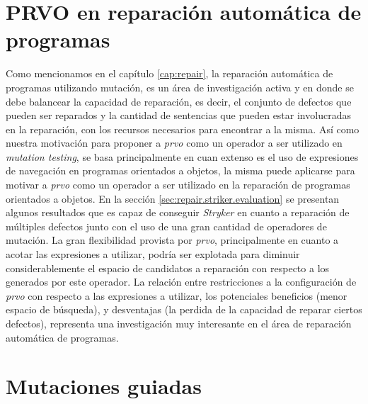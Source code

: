 \section{PRVO en reparaci\'on autom\'atica de programas}

Como mencionamos en el cap\'itulo \ref{cap:repair}, la reparaci\'on autom\'atica de programas utilizando mutaci\'on, es un \'area de investigaci\'on activa y en donde se debe balancear la capacidad de reparaci\'on, es decir, el conjunto de defectos que pueden ser reparados y la cantidad de sentencias que pueden estar involucradas en la reparaci\'on, con los recursos necesarios para encontrar a la misma. As\'i como nuestra motivaci\'on para proponer a \emph{prvo} como un operador a ser utilizado en \emph{mutation testing}, se basa principalmente en cuan extenso es el uso de expresiones de navegaci\'on en programas orientados a objetos, la misma puede aplicarse para motivar a \emph{prvo} como un operador a ser utilizado en la reparaci\'on de programas orientados a objetos. En la secci\'on \ref{sec:repair.striker.evaluation} se presentan algunos resultados que es capaz de conseguir \emph{Stryker} en cuanto a reparaci\'on de m\'ultiples defectos junto con el uso de una gran cantidad de operadores de mutaci\'on. La gran flexibilidad provista por \emph{prvo}, principalmente en cuanto a acotar las expresiones a utilizar, podr\'ia ser explotada para diminuir considerablemente el espacio de candidatos a reparaci\'on con respecto a los generados por este operador. La relaci\'on entre restricciones a la configuraci\'on de \emph{prvo} con respecto a las expresiones a utilizar, los potenciales beneficios (menor espacio de b\'usqueda), y desventajas (la perdida de la capacidad de reparar ciertos defectos), representa una investigaci\'on muy interesante en el \'area de reparaci\'on autom\'atica de programas.

\section{Mutaciones guiadas}

